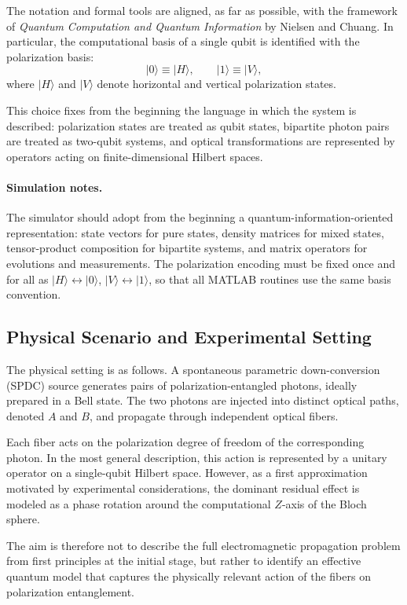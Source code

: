 \documentclass[a4paper]{article}
\begin{document}
The notation and formal tools are aligned, as far as possible, with the framework of \textit{Quantum Computation and Quantum Information} by Nielsen and Chuang. In particular, the computational basis of a single qubit is identified with the polarization basis:
\[
|0\rangle \equiv |H\rangle,
\qquad
|1\rangle \equiv |V\rangle,
\]
where \( |H\rangle \) and \( |V\rangle \) denote horizontal and vertical polarization states.

This choice fixes from the beginning the language in which the system is described: polarization states are treated as qubit states, bipartite photon pairs are treated as two-qubit systems, and optical transformations are represented by operators acting on finite-dimensional Hilbert spaces.

\paragraph{Simulation notes.}
The simulator should adopt from the beginning a quantum-information-oriented representation: state vectors for pure states, density matrices for mixed states, tensor-product composition for bipartite systems, and matrix operators for evolutions and measurements. The polarization encoding must be fixed once and for all as \( |H\rangle \leftrightarrow |0\rangle \), \( |V\rangle \leftrightarrow |1\rangle \), so that all MATLAB routines use the same basis convention.

\subsection{Physical Scenario and Experimental Setting}

The physical setting is as follows. A spontaneous parametric down-conversion (SPDC) source generates pairs of polarization-entangled photons, ideally prepared in a Bell state. The two photons are injected into distinct optical paths, denoted \(A\) and \(B\), and propagate through independent optical fibers.

Each fiber acts on the polarization degree of freedom of the corresponding photon. In the most general description, this action is represented by a unitary operator on a single-qubit Hilbert space. However, as a first approximation motivated by experimental considerations, the dominant residual effect is modeled as a phase rotation around the computational \(Z\)-axis of the Bloch sphere.

The aim is therefore not to describe the full electromagnetic propagation problem from first principles at the initial stage, but rather to identify an effective quantum model that captures the physically relevant action of the fibers on polarization entanglement.
\end{document}
